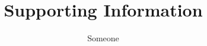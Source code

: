\documentclass[a4paper]{article}
\title{Supporting Information}
\author{Someone}
\date{}
\begin{document}
\maketitle
\lipsum


\end{document}
